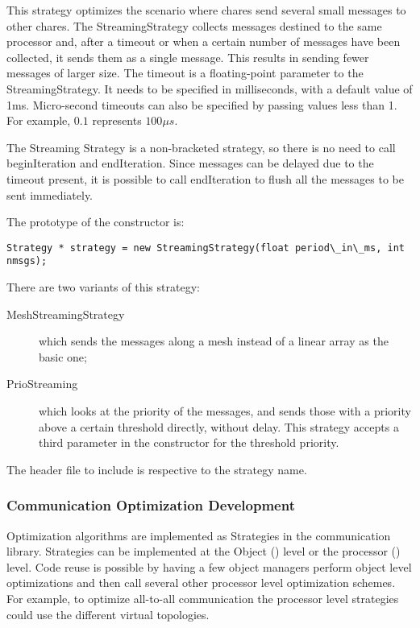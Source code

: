 {This strategy optimizes the scenario where chares send several small messages to
other chares. The StreamingStrategy collects messages destined to the same
processor and, after a timeout or when a certain number of messages have been
collected, it sends them as a single message. This results in sending fewer
messages of larger size. The timeout is a floating-point parameter to the
StreamingStrategy. It needs to be specified in milliseconds, with a default
value of 1ms. Micro-second timeouts can also be specified by passing values less
than 1. For example, $0.1$ represents $100\mu s$.

The Streaming Strategy is a non-bracketed strategy, so there is no need to call
{\textrm{beginIteration}} and {\textrm{endIteration}}. Since messages can be
delayed due to the timeout present, it is possible to call
{\textrm{endIteration}} to flush all the messages to be sent immediately.

The prototype of the constructor is:

\begin{verbatim}
Strategy * strategy = new StreamingStrategy(float period\_in\_ms, int nmsgs);
\end{verbatim}

There are two variants of this strategy:

\begin{description}
\item[MeshStreamingStrategy] which sends the messages along a mesh instead of a linear array as the basic one;
\item[PrioStreaming] which looks at the priority of the messages, and sends those with a priority above a certain threshold directly, without delay. This strategy accepts a third parameter in the constructor for the threshold priority.
\end{description}

The header file to include is respective to the strategy name.

\subsubsection{Communication Optimization Development}

Optimization algorithms are implemented as Strategies in the communication
library. Strategies can be implemented at the Object (\charmpp) level or the
processor (\converse) level. Code reuse is possible by having a few object
managers perform object level optimizations and then call several other
processor level optimization schemes. For example, to optimize all-to-all
communication the processor level strategies could use the different virtual
topologies.

}
